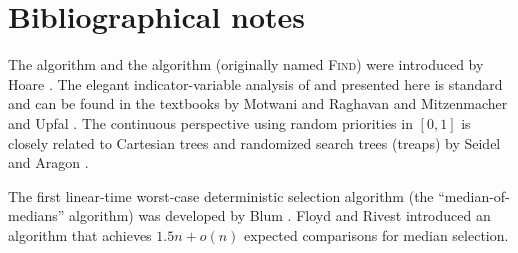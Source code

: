 \section{Bibliographical notes}

The \QuickSort algorithm and the \QuickSelect algorithm (originally named
\textsc{Find}) were introduced by Hoare \cite{h-a6q-61, h-a6f-61,
   h-q-62}.  The elegant indicator-variable analysis of \QuickSort
and \QuickSelect presented here is standard and can be found in the
textbooks by Motwani and Raghavan \cite{mr-ra-95} and
Mitzenmacher and Upfal \cite{mu-pcrpt-17}.  The continuous
perspective using random priorities in $[0,1]$ is closely related to
Cartesian trees and randomized search trees (treaps) by Seidel and Aragon
\cite{sa-rst-96}.

The first linear-time worst-case deterministic selection algorithm (the ``median-of-medians'' algorithm)
was developed by Blum \etal \cite{bfprt-tbs-73}.
Floyd and Rivest \cite{fr-etbs-75, fr-a4s-75} introduced an algorithm
that achieves $1.5n + o(n)$ expected comparisons for median selection.


\ChapterEnd{}




